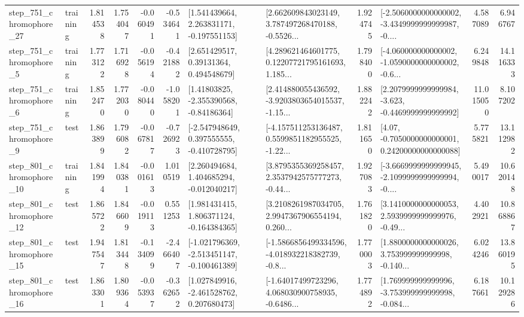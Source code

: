 \begin{tabular}{llrrrrllrlrr}
  step\_751\_chromophore\_27 &  training &      1.814538 &    1.754047 &     -0.060491 & -0.534641 &    [1.541439664, 2.263831171, -0.197551153] &  [2.662609843023149, 3.787497268470188, -0.5526... &       1.924745 &  [-2.5060000000000002, -3.4349999999999987, -0.... &            4.587089 &          6.946767 \\
   step\_751\_chromophore\_5 &  training &      1.773122 &    1.716928 &     -0.056194 & -0.421882 &      [2.651429517, 0.39131364, 0.494548679] &  [4.289621464601775, 0.12207721795161693, 1.185... &       1.798400 &  [-4.060000000000002, -1.0590000000000002, -0.6... &            6.249848 &         14.116333 \\
   step\_751\_chromophore\_6 &  training &      1.852470 &    1.772030 &     -0.080440 & -1.058201 &     [1.41803825, -2.355390568, -0.84186364] &  [2.414880055436592, -3.9203803654015537, -1.15... &       1.882242 &  [2.2079999999999984, -3.623, -0.4469999999999992] &           11.015050 &          8.107202 \\
   step\_751\_chromophore\_9 &      test &      1.863899 &    1.796082 &     -0.067817 & -0.726923 &   [-2.547948649, 0.397555555, -0.410728795] &  [-4.157511253136487, 0.5599851182955525, -1.22... &       1.811650 &   [4.07, -0.7050000000000001, 0.24200000000000088] &            5.775821 &         13.112982 \\
  step\_801\_chromophore\_10 &  training &      1.841994 &    1.840381 &     -0.001613 &  1.010519 &    [2.260494684, 1.404685294, -0.012040217] &  [3.8795355369258457, 2.3537942575777273, -0.44... &       1.927083 &  [-3.6669999999999945, -2.1099999999999994, -0.... &            5.490017 &         10.620148 \\
  step\_801\_chromophore\_12 &      test &      1.865722 &    1.846609 &     -0.019113 &  0.551253 &    [1.981431415, 1.806371124, -0.164384365] &  [3.2108261987034705, 2.9947367906554194, 0.260... &       1.761820 &  [3.1410000000000053, 2.5939999999999976, -0.49... &            4.402921 &         10.868867 \\
  step\_801\_chromophore\_15 &      test &      1.947547 &    1.813448 &     -0.134099 & -2.466407 &  [-1.021796369, -2.513451147, -0.100461389] &  [-1.5866856499334596, -4.018932218382739, -0.8... &       1.770003 &  [1.8800000000000026, 3.753999999999998, -0.140... &            6.024246 &         13.860195 \\
  step\_801\_chromophore\_16 &      test &      1.863301 &    1.809364 &     -0.053937 & -0.362652 &    [1.027849916, -2.461528762, 0.207680473] &  [-1.64017499723296, 4.068030900758935, -0.6486... &       1.774892 &  [1.769999999999996, -3.753999999999998, -0.084... &            6.187661 &         10.129286 \\

\end{tabular}
